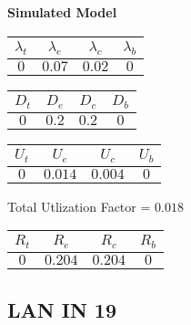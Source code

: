 \documentclass{article}
\begin{document}
\begin{minipage}{0.5\textwidth}
\centering	\textbf{Simulated Model}
\begin{table}[H]
\centering
\begin{tabular}{@{}cccc@{}}
\toprule
$\lambda_t$ & $\lambda_e$ & $\lambda_c$ & $\lambda_b$\\
\midrule
$0$ & $0.07$ & $0.02$ & $0$\\
\bottomrule
\end{tabular}
\end{table}
\begin{table}[H]
\centering
\begin{tabular}{@{}cccc@{}}
\toprule
$D_t$ & $D_e$ & $D_c$ & $D_b$\\
\midrule
$0$ & $0.2$ & $0.2$ & $0$\\
\bottomrule
\end{tabular}
\end{table}\begin{table}[H]
\centering
\begin{tabular}{@{}cccc@{}}
\toprule
$U_t$ & $U_e$ & $U_c$ & $U_b$\\
\midrule
$0$ & $0.014$ & $0.004$ & $0$\\
\bottomrule
\end{tabular}
\end{table}
\centering Total Utlization Factor = $0.018$
\begin{table}[H]
\centering
\begin{tabular}{@{}cccc@{}}
\toprule
$R_t$ & $R_e$ & $R_c$ & $R_b$\\
\midrule
$0$ & $0.204$ & $0.204$ & $0$\\
\bottomrule
\end{tabular}
\end{table}
\end{minipage}\subsection{LAN IN 19}
\end{document}
